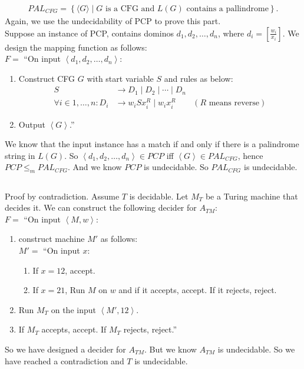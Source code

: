 \documentclass{article}
\begin{document}
\subsubsection{}
\begin{align*}
PAL_{CFG} = \left\{\langle G\rangle \mid G \text{ is a CFG and } L(G) \text{ contains a pallindrome}\right\}.
\end{align*}
Again, we use the undecidability of PCP to prove this part.\\
Suppose an instance of PCP, contains dominos \(d_1, d_2, \dots, d_n\), where \(d_i=\left[\frac{w_i}{x_i}\right]\).
We design the mapping function as follows:\\[7pt]
\(F = \) ``On input \(\left\langle d_1, d_2, \dots, d_n\right\rangle\):
\begin{enumerate}
\item Construct CFG \(G\) with start variable \(S\) and rules as below:
\begin{align*}
S &\to D_1 \mid D_2 \mid \cdots \mid D_n\\
\forall i \in {1, \ldots, n}: D_i &\to w_i S x_i^R \mid w_i x_i^R & (R \text{ means reverse})
\end{align*}
\item Output \(\left\langle G\right\rangle\).''
\end{enumerate}

We know that the input instance has a match if and only if there is a palindrome string in \(L(G)\).
So \(\left\langle d_1, d_2, \dots, d_n\right\rangle \in PCP\) iff \(\left\langle G\right\rangle \in PAL_{CFG}\), hence \(PCP\leq_m PAL_{CFG}\).
And we know \(PCP\) is undecidable. So \(PAL_{CFG}\) is undecidable.

\subsection{}
Proof by contradiction.
Assume \(T\) is decidable.
Let \(M_T\) be a Turing machine that decides it.
We can construct the following decider for \(A_{TM}\):\\[7pt]
\(F = \) ``On input \(\left\langle M, w\right\rangle\):
\begin{enumerate}
\item construct machine \(M'\) as follows:\\
\(M' = \) ``On input \(x\):
\begin{enumerate}[label=\(\arabic*.\)]
\item If \(x = 12\), accept.
\item If \(x = 21\), Run \(M\) on \(w\) and if it accepts, accept. If it rejects, reject.
\end{enumerate}
\item Run \(M_T\) on the input \(\left\langle M', 12\right\rangle\).
\item If \(M_T\) accepts, accept. If \(M_T\) rejects, reject.''
\end{enumerate}
So we have designed a decider for \(A_{TM}\). But we know \(A_{TM}\) is undecidable.
So we have reached a contradiction and \(T\) is undecidable.
\end{document}
